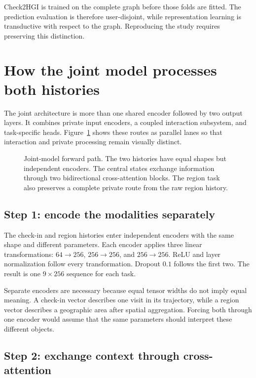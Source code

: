 Check2HGI is trained on the complete graph before those folds are fitted. The
prediction evaluation is therefore user-disjoint, while representation learning is
transductive with respect to the graph. Reproducing the study requires preserving
this distinction.

\section{How the joint model processes both histories}
\label{sec:apx-joint-forward}

The joint architecture is more than one shared encoder followed by two output
layers. It combines private input encoders, a coupled interaction subsystem, and
task-specific heads. Figure~\ref{fig:apx-joint-flow} shows these routes as parallel
lanes so that interaction and private processing remain visually distinct.

\begin{figure}[H]
    \centering
    
    \caption{Joint-model forward path. The two histories have equal shapes but
    independent encoders. The central states exchange information through two
    bidirectional cross-attention blocks. The region task also preserves a complete
    private route from the raw region history.}
    \label{fig:apx-joint-flow}
\end{figure}

\subsection{Step 1: encode the modalities separately}

The check-in and region histories enter independent encoders with the same shape
and different parameters. Each encoder applies three linear transformations:
$64\rightarrow256$, $256\rightarrow256$, and $256\rightarrow256$. ReLU and layer
normalization follow every transformation. Dropout $0.1$ follows the first two.
The result is one $9\times256$ sequence for each task.

Separate encoders are necessary because equal tensor widths do not imply equal
meaning. A check-in vector describes one visit in its trajectory, while a region
vector describes a geographic area after spatial aggregation. Forcing both through
one encoder would assume that the same parameters should interpret these different
objects.

\subsection{Step 2: exchange context through cross-attention}

